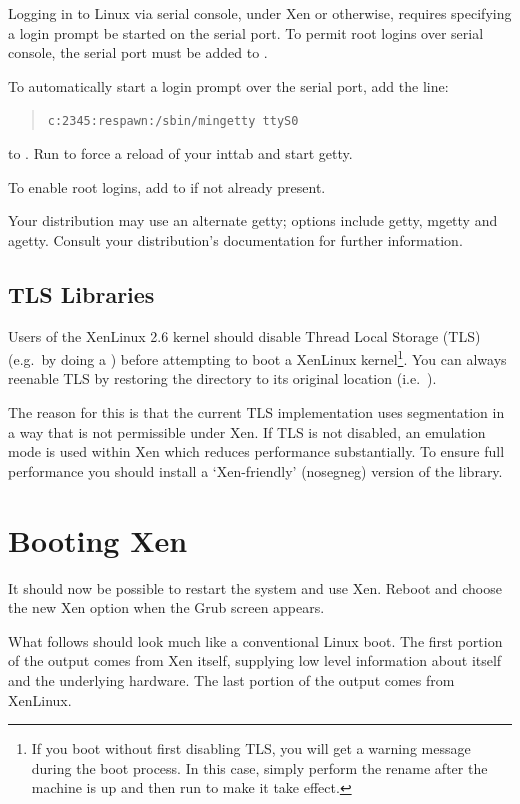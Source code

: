 \documentclass[11pt,twoside,final,openright]{report}
\begin{document}
Logging in to Linux via serial console, under Xen or otherwise, requires
specifying a login prompt be started on the serial port.  To permit root
logins over serial console, the serial port must be added to
.

\newpage
To automatically start a login prompt over the serial port, 
add the line: \begin{quote} {\small {\tt c:2345:respawn:/sbin/mingetty
ttyS0}} \end{quote} to .   Run  to force
a reload of your inttab and start getty.

To enable root logins, add  to  if not
already present.

Your distribution may use an alternate getty; options include getty,
mgetty and agetty.  Consult your distribution's documentation
for further information.


\subsection{TLS Libraries}

Users of the XenLinux 2.6 kernel should disable Thread Local Storage
(TLS) (e.g.\ by doing a ) before
attempting to boot a XenLinux kernel\footnote{If you boot without first
  disabling TLS, you will get a warning message during the boot process.
  In this case, simply perform the rename after the machine is up and
  then run  to make it take effect.}. You can
always reenable TLS by restoring the directory to its original location
(i.e.\ ).

The reason for this is that the current TLS implementation uses
segmentation in a way that is not permissible under Xen. If TLS is not
disabled, an emulation mode is used within Xen which reduces performance
substantially. To ensure full performance you should install a 
`Xen-friendly' (nosegneg) version of the library. 


\section{Booting Xen}

It should now be possible to restart the system and use Xen. Reboot and
choose the new Xen option when the Grub screen appears.

What follows should look much like a conventional Linux boot. The first
portion of the output comes from Xen itself, supplying low level
information about itself and the underlying hardware. The last portion
of the output comes from XenLinux.
\end{document}
